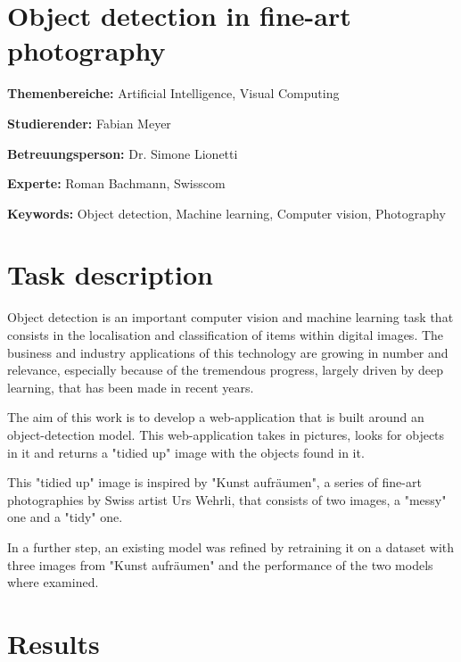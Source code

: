 \documentclass[a4paper,10pt,hidelinks]{scrartcl}
\begin{document}
\section*{\fontsize{18}{20}\selectfont Object detection in fine-art photography}
\thispagestyle{firstpage}

\textbf{Themenbereiche:} \tabto{4cm} Artificial Intelligence, Visual Computing

\noindent
\textbf{Studierender:} \tabto{4cm} Fabian Meyer

\noindent
\textbf{Betreuungsperson:} \tabto{4cm} Dr. Simone Lionetti

\noindent
\textbf{Experte:} \tabto{4cm} Roman Bachmann, Swisscom

\noindent
\textbf{Keywords:} \tabto{4cm} Object detection, Machine learning, Computer vision, Photography

\section{\fontsize{14}{16}\selectfont Task description}

Object detection is an important computer vision and machine learning task that consists in the localisation and classification of items within digital images. The business and industry applications of this technology are growing in number and relevance, especially because of the tremendous progress, largely driven by deep learning, that has been made in recent years.

The aim of this work is to develop a web-application that is built around an object-detection model. This web-application takes in pictures, looks for objects in it and returns a "tidied up" image with the objects found in it. 

This "tidied up" image is inspired by "Kunst aufräumen", a series of fine-art photographies by Swiss artist Urs Wehrli, that consists of two images, a "messy" one and a "tidy" one.

In a further step, an existing model was refined by retraining it on a dataset with three images from "Kunst aufräumen" and the performance of the two models where examined.

\section{\fontsize{14}{16}\selectfont Results}
\end{document}
